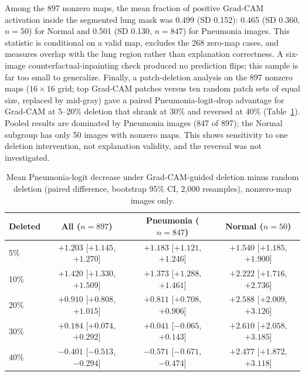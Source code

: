 \documentclass[11pt,a4paper]{article}
\begin{document}
Among the 897 nonzero maps, the mean fraction of positive Grad-CAM activation
inside the segmented lung mask was 0.499 (SD 0.152): 0.465 (SD 0.360, $n=50$) for
Normal and 0.501 (SD 0.130, $n=847$) for Pneumonia images. This statistic is
conditional on a valid map, excludes the 268 zero-map cases, and measures overlap
with the lung region rather than explanation correctness. A six-image
counterfactual-inpainting check produced no prediction flips; this sample is far
too small to generalize. Finally, a patch-deletion analysis on the 897 nonzero maps ($16\times16$ grid; top Grad-CAM patches
versus ten random patch sets of equal size, replaced by mid-gray) gave a paired Pneumonia-logit-drop
advantage for Grad-CAM at 5--20\% deletion that shrank at 30\% and reversed at 40\%
(Table~\ref{tab:deletion}). Pooled results are dominated by Pneumonia images (847 of 897); the Normal
subgroup has only 50 images with nonzero maps. This shows sensitivity to one deletion intervention, not
explanation validity, and the reversal was not investigated.

\begin{table}[htbp]
\centering
\caption{Mean Pneumonia-logit decrease under Grad-CAM-guided deletion minus random deletion (paired
difference, bootstrap 95\% CI, 2,000 resamples), nonzero-map images only.}
\label{tab:deletion}
\small
\begin{tabular}{lccc}
\toprule
Deleted & All ($n=897$) & Pneumonia ($n=847$) & Normal ($n=50$) \\
\midrule
5\% & $+1.203$ [$+1.145$, $+1.270$] & $+1.183$ [$+1.121$, $+1.246$] & $+1.540$ [$+1.185$, $+1.900$] \\
10\% & $+1.420$ [$+1.330$, $+1.509$] & $+1.373$ [$+1.288$, $+1.461$] & $+2.222$ [$+1.716$, $+2.736$] \\
20\% & $+0.910$ [$+0.808$, $+1.015$] & $+0.811$ [$+0.708$, $+0.906$] & $+2.588$ [$+2.009$, $+3.126$] \\
30\% & $+0.184$ [$+0.074$, $+0.292$] & $+0.041$ [$-0.065$, $+0.143$] & $+2.610$ [$+2.058$, $+3.185$] \\
40\% & $-0.401$ [$-0.513$, $-0.294$] & $-0.571$ [$-0.671$, $-0.474$] & $+2.477$ [$+1.872$, $+3.118$] \\
\bottomrule
\end{tabular}
\end{table}


\end{document}

